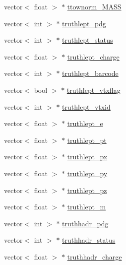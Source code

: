 \begin{DoxyCompactItemize}
vector$<$ float $>$ $\ast$ \hyperlink{classJetAnalysisExample_acbc3bea566bd0257afa5895f272283f1}{ttownorm\+\_\+\+M\+A\+SS}
\item 
vector$<$ int $>$ $\ast$ \hyperlink{classJetAnalysisExample_ab8347ef4a2fc8571ba95aeb3d5f4360f}{truthlept\+\_\+pdg}
\item 
vector$<$ int $>$ $\ast$ \hyperlink{classJetAnalysisExample_a4535cae24aaa408ea463c611e9aab1ee}{truthlept\+\_\+status}
\item 
vector$<$ float $>$ $\ast$ \hyperlink{classJetAnalysisExample_ac3af071bab02f4fedb09f943b728f49d}{truthlept\+\_\+charge}
\item 
vector$<$ int $>$ $\ast$ \hyperlink{classJetAnalysisExample_ae0f27f9c4b2ade67f72c862cb16b625e}{truthlept\+\_\+barcode}
\item 
vector$<$ bool $>$ $\ast$ \hyperlink{classJetAnalysisExample_a63e422f101e499e7747139a6ccfa8014}{truthlept\+\_\+vtxflag}
\item 
vector$<$ int $>$ $\ast$ \hyperlink{classJetAnalysisExample_a39feef874f26b2c9257699c19a87c704}{truthlept\+\_\+vtxid}
\item 
vector$<$ float $>$ $\ast$ \hyperlink{classJetAnalysisExample_a9cef2c3c17bee4d00a22d707cb7f762d}{truthlept\+\_\+e}
\item 
vector$<$ float $>$ $\ast$ \hyperlink{classJetAnalysisExample_aa135c5c9af9f5cc4ed455ce4d25af3c5}{truthlept\+\_\+pt}
\item 
vector$<$ float $>$ $\ast$ \hyperlink{classJetAnalysisExample_af79c2cf4ebfeeae9f42d7adb7d7b8c4a}{truthlept\+\_\+px}
\item 
vector$<$ float $>$ $\ast$ \hyperlink{classJetAnalysisExample_a131e60265fbc23deb03be44be316726a}{truthlept\+\_\+py}
\item 
vector$<$ float $>$ $\ast$ \hyperlink{classJetAnalysisExample_a509bf19926cc7c48c5fc28bb08f8758d}{truthlept\+\_\+pz}
\item 
vector$<$ float $>$ $\ast$ \hyperlink{classJetAnalysisExample_abfa84c832f3225b37d2fe45c4872189c}{truthlept\+\_\+m}
\item 
vector$<$ int $>$ $\ast$ \hyperlink{classJetAnalysisExample_a19e41607c9545923c6c02e3e4b164097}{truthhadr\+\_\+pdg}
\item 
vector$<$ int $>$ $\ast$ \hyperlink{classJetAnalysisExample_a4daa9c00476382865b7039a05b7b394a}{truthhadr\+\_\+status}
\item 
vector$<$ float $>$ $\ast$ \hyperlink{classJetAnalysisExample_a8361a47e72f468afc53d0af142e692a8}{truthhadr\+\_\+charge}
\item 

\end{DoxyCompactItemize}
